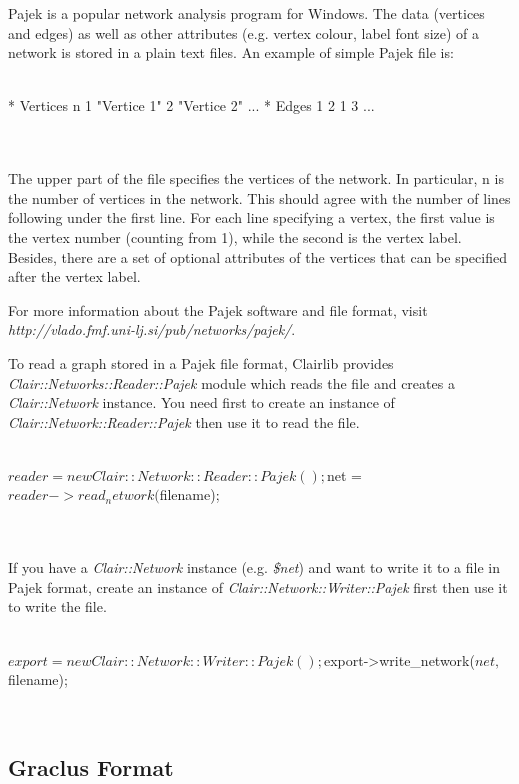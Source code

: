 Pajek is a popular network analysis program for Windows. The data (vertices and edges) as well as other attributes (e.g. vertex colour, label font size) of a network is stored in a plain text files. An example of simple Pajek file is:
\\
\\
\begin{boxedverbatim}
* Vertices n
  1 "Vertice 1"
  2 "Vertice 2"
  ...
* Edges
  1 2
  1 3
  ...
\end{boxedverbatim}
\\
\\
The upper part of the file specifies the vertices of the network. In particular, n is the number of vertices in the network. This should agree with the number of lines following under the first line. For each line specifying a vertex, the first value is the vertex number (counting from 1), while the second is the vertex label. Besides, there are a set of optional attributes of the vertices that can be specified after the vertex label.

For more information about the Pajek software and file format, visit \emph{http://vlado.fmf.uni-lj.si/pub/networks/pajek/}.

To read a graph stored in a Pajek file format, Clairlib provides \emph{Clair::Networks::Reader::Pajek} module which reads the file and creates a \emph{Clair::Network} instance. You need first to create an instance of \emph{Clair::Network::Reader::Pajek} then use it to read the file.
\\
\\
\begin{boxedverbatim}
$reader = new Clair::Network::Reader::Pajek();
$net = $reader->read_network($filename);
\end{boxedverbatim}
\\
\\
If you have a \emph{Clair::Network} instance (e.g. \emph{\$net}) and want to write it to a file in Pajek format, create an instance of \emph{Clair::Network::Writer::Pajek} first then use it to write the file.
\\
\\
\begin{boxedverbatim}
$export = new Clair::Network::Writer::Pajek();
$export->write_network($net, $filename);
\end{boxedverbatim}
\\
\subsection{Graclus Format}

